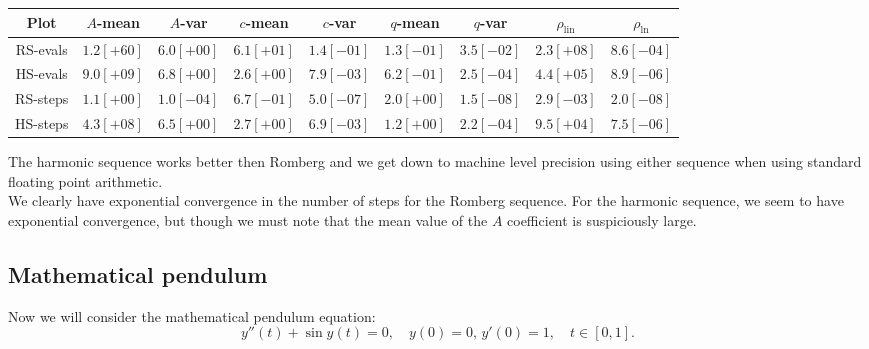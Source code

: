 \begin{table}[H]
    \centering
    \small
    \begin{tabular}{c||c|c|c|c|c|c|c|c}
Plot & \(A\)-mean & \(A\)-var & \(c\)-mean & \(c\)-var & \(q\)-mean & \(q\)-var & \(\rho_{\operatorname{lin}}\) & \(\rho_{\ln}\)\\\hline
\rowcolor{red}
RS-evals & \(1.2[+60]\) & \(6.0[+00]\) & \(6.1[+01]\) & \(1.4[-01]\) & \(1.3[-01]\) & \(3.5[-02]\) & \(2.3[+08]\) & \(8.6[-04]\) \\
\rowcolor{yellow}
HS-evals & \(9.0[+09]\) & \(6.8[+00]\) & \(2.6[+00]\) & \(7.9[-03]\) & \(6.2[-01]\) & \(2.5[-04]\) & \(4.4[+05]\) & \(8.9[-06]\) \\
\rowcolor{green}
RS-steps & \(1.1[+00]\) & \(1.0[-04]\) & \(6.7[-01]\) & \(5.0[-07]\) & \(2.0[+00]\) & \(1.5[-08]\) & \(2.9[-03]\) & \(2.0[-08]\) \\
\rowcolor{yellow}
HS-steps & \(4.3[+08]\) & \(6.5[+00]\) & \(2.7[+00]\) & \(6.9[-03]\) & \(1.2[+00]\) & \(2.2[-04]\) & \(9.5[+04]\) & \(7.5[-06]\) \\
    \end{tabular}
    \label{tab:my_label}
\end{table}

The harmonic sequence works better then Romberg and we get down to machine level precision using either sequence when using standard floating point arithmetic.\\

We clearly have exponential convergence in the number of steps for the Romberg sequence. For the harmonic sequence, we seem to have exponential convergence, but though we must note that the mean value of the \(A\) coefficient is suspiciously large.

\subsection{Mathematical pendulum}

Now we will consider the mathematical pendulum equation:
\begin{equation}
y''(t) + \sin y(t) = 0,\quad y(0) = 0,\, y'(0) = 1, \quad t\in [0,1].
\end{equation}


